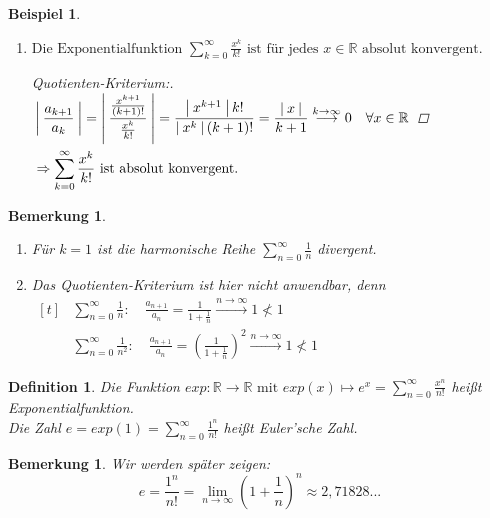 \documentclass[a4paper,titlepage,oneside]{article}
\def\R{\ensuremath{\mathbb{R}} }
\def\e{\ensuremath{\mathit{e}} }
\def\sp{\hspace{0,1cm}}
\newcommand{\suminf}[2][n]{\ensuremath{\sum_{#1= 0}^{\infty}{#2}}}
\renewcommand{\liminf}[2][n]{\ensuremath{\lim\limits_{#1 \rightarrow \infty}{#2}}}
\newcommand{\abs}[1]{\ensuremath{\left|\:#1\:\right|}}
\newcommand{\longtoinf}[1][n]{\ensuremath{\overset{\scriptscriptstyle{#1 \to \infty}}{\longrightarrow}}}
\theoremstyle{thmstyle}
\newtheorem{defi}[satz]{Definition}
\newtheorem{bsp}[satz]{Beispiel}
\newtheorem{bem}[satz]{Bemerkung}
\theoremstyle{subthmstyle}
\begin{document}
\begin{bsp}
\begin{enumerate}
\item
$\displaystyle\text{Die Exponentialfunktion } \suminf[k]{\frac{x^k}{k!}} \text{ ist für jedes } x \in \R \text{ absolut konvergent.}$

\begin{proof}[Quotienten-Kriterium:]\sp\\
\begin{math}\displaystyle \begin{aligned}[t]
&\abs{\frac{a_{k+1}}{a_k}} = \abs{\frac{\frac{x^{k+1}}{(k+1)!}}{\frac{x^k}{k!}}} = \frac{\abs{x^{k+1}} k!}{\abs{x^k} (k+1)!} = \frac{\abs{x}}{k+1} \overset{k \to \infty}{\longrightarrow} 0 \quad \forall x \in \R \\
&\Rightarrow \suminf[k]{\frac{x^k}{k!}} \text{ ist absolut konvergent.}
\end{aligned}\\\end{math}
\end{proof}
\end{enumerate}
\end{bsp}

\begin{bem}
\begin{enumerate}
Eine Bemerkung zur Divergenz.
\item Für \(k = 1\) ist die harmonische Reihe \suminf{\frac{1}{n}} divergent.
\item Das Quotienten-Kriterium ist hier nicht anwendbar, denn \\
\begin{math}\displaystyle \begin{aligned}[t]
&\suminf{\frac{1}{n}} : \quad \frac{a_{n+1}}{a_n} = \frac{1}{1 + \frac{1}{n}} \longtoinf 1 \not < 1 \\
&\suminf{\frac{1}{n^2}} : \quad \frac{a_{n+1}}{a_n} = \left(\frac{1}{1 + \frac{1}{n}}\right)^2 \longtoinf 1 \not < 1
\end{aligned}\end{math} 
\end{enumerate}
\end{bem}

\begin{defi}
Die Funktion \(exp: \R \to \R \text{ mit } exp(x) \mapsto \e^x = \suminf{\frac{x^n}{n!}}\) heißt Exponentialfunktion.\\
Die Zahl \(\e = exp(1) = \suminf{\frac{1^n}{n!}} \) heißt Euler'sche Zahl.
\end{defi}

\begin{bem}
Wir werden später zeigen:
\[\e = \frac{1^n}{n!} = \liminf{\left(1 + \frac{1}{n}\right)^n} \approx 2,71828...\]
\end{bem}
\end{document}
